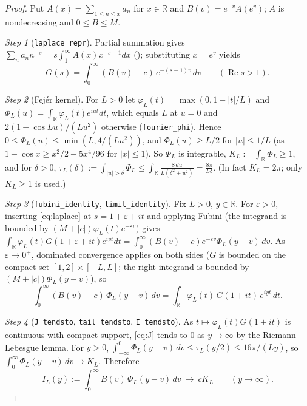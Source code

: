 \documentclass[11pt]{amsart}
\theoremstyle{plain}
\theoremstyle{definition}
\newcommand{\code}[1]{\texttt{#1}}
\newcommand{\R}{\mathbb{R}}
\newcommand{\re}{\operatorname{Re}}
\begin{document}
\begin{proof}
Put $A(x)=\sum_{1\le n\le x}a_n$ for $x\in\R$ and $B(v)=e^{-v}A(e^v)$; $A$ is nondecreasing and $0\le B\le M$.

\emph{Step 1} (\code{laplace\_repr}). Partial summation gives $\sum_na_nn^{-s}=s\int_1^\infty A(x)x^{-s-1}dx$ (); substituting $x=e^v$ yields
\begin{equation}\label{eq:laplace}
  G(s)=\int_0^\infty(B(v)-c)\,e^{-(s-1)v}\,dv\qquad(\re s>1).
\end{equation}

\emph{Step 2} (Fej\'er kernel). For $L>0$ let $\varphi_L(t)=\max(0,1-|t|/L)$ and $\Phi_L(u)=\int_\R\varphi_L(t)e^{iut}dt$, which equals $L$ at $u=0$ and $2(1-\cos Lu)/(Lu^2)$ otherwise (\code{fourier\_phi}). Hence $0\le\Phi_L(u)\le\min(L,4/(Lu^2))$, and $\Phi_L(u)\ge L/2$ for $|u|\le1/L$ (as $1-\cos x\ge x^2/2-5x^4/96$ for $|x|\le1$). So $\Phi_L$ is integrable, $K_L:=\int_\R\Phi_L\ge1$, and for $\delta>0$, $\tau_L(\delta):=\int_{|u|>\delta}\Phi_L\le\int_\R\frac{8\,du}{L(\delta^2+u^2)}=\frac{8\pi}{L\delta}$. (In fact $K_L=2\pi$; only $K_L\ge1$ is used.)

\emph{Step 3} (\code{fubini\_identity}, \code{limit\_identity}). Fix $L>0$, $y\in\R$. For $\varepsilon>0$, inserting \eqref{eq:laplace} at $s=1+\varepsilon+it$ and applying Fubini (the integrand is bounded by $(M+|c|)\varphi_L(t)e^{-\varepsilon v}$) gives $\int_\R\varphi_L(t)G(1+\varepsilon+it)e^{iyt}dt=\int_0^\infty(B(v)-c)e^{-\varepsilon v}\Phi_L(y-v)\,dv$. As $\varepsilon\to0^+$, dominated convergence applies on both sides ($G$ is bounded on the compact set $[1,2]\times[-L,L]$; the right integrand is bounded by $(M+|c|)\Phi_L(y-v)$), so
\begin{equation}\label{eq:J}
  \int_0^\infty(B(v)-c)\,\Phi_L(y-v)\,dv=\int_\R\varphi_L(t)\,G(1+it)\,e^{iyt}\,dt .
\end{equation}

\emph{Step 4} (\code{J\_tendsto}, \code{tail\_tendsto}, \code{I\_tendsto}). As $t\mapsto\varphi_L(t)G(1+it)$ is continuous with compact support, \eqref{eq:J} tends to $0$ as $y\to\infty$ by the Riemann--Lebesgue lemma. For $y>0$, $\int_{-\infty}^0\Phi_L(y-v)\,dv\le\tau_L(y/2)\le16\pi/(Ly)$, so $\int_0^\infty\Phi_L(y-v)\,dv\to K_L$. Therefore
\begin{equation}\label{eq:I}
  I_L(y):=\int_0^\infty B(v)\,\Phi_L(y-v)\,dv\ \longrightarrow\ cK_L\qquad(y\to\infty).
\end{equation}


\end{proof}
\end{document}
